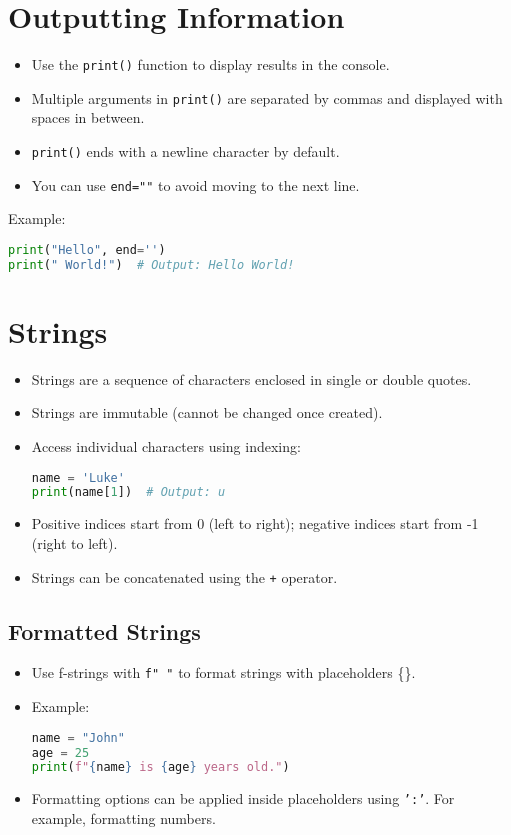 \documentclass{article}
\begin{document}
\section{Outputting Information}
\begin{itemize}
    \item Use the \texttt{print()} function to display results in the console.
    \item Multiple arguments in \texttt{print()} are separated by commas and displayed with spaces in between.
    \item \texttt{print()} ends with a newline character by default.
    \item You can use \texttt{end=""} to avoid moving to the next line.
\end{itemize}
Example:
\begin{lstlisting}[language=python]
print("Hello", end='')
print(" World!")  # Output: Hello World!
\end{lstlisting}

\section{Strings}
\begin{itemize}
    \item Strings are a sequence of characters enclosed in single or double quotes.
    \item Strings are immutable (cannot be changed once created).
    \item Access individual characters using indexing:
\begin{lstlisting}[language=python]
name = 'Luke'
print(name[1])  # Output: u
\end{lstlisting}
    \item Positive indices start from 0 (left to right); negative indices start from -1 (right to left).
    \item Strings can be concatenated using the \texttt{+} operator.
\end{itemize}

\subsection{Formatted Strings}
\begin{itemize}
    \item Use f-strings with \texttt{f" "} to format strings with placeholders \{\}.
    \item Example:
\begin{lstlisting}[language=python]
name = "John"
age = 25
print(f"{name} is {age} years old.")
    \end{lstlisting}
    \item Formatting options can be applied inside placeholders using \texttt{':'}. For example, formatting numbers.
\end{itemize}
\end{document}

